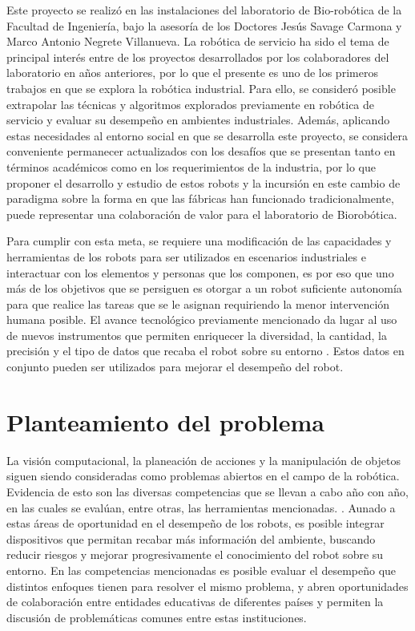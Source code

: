 Este proyecto se realizó en las instalaciones del laboratorio de Bio-robótica de la Facultad de Ingeniería, bajo la asesoría de los Doctores Jesús Savage Carmona y Marco Antonio Negrete Villanueva. La robótica de servicio ha sido el tema de principal interés entre de los proyectos desarrollados por los colaboradores del laboratorio en años anteriores, por lo que el presente es uno de los primeros trabajos en que se explora la robótica industrial. Para ello, se consideró posible extrapolar las técnicas y algoritmos explorados previamente en robótica de servicio y evaluar su desempeño en ambientes industriales. Además, aplicando estas necesidades al entorno social en que se desarrolla este proyecto, se considera conveniente permanecer actualizados con los desafíos que se presentan tanto en términos académicos como en los requerimientos de la industria, por lo que proponer el desarrollo y estudio de estos robots y la incursión en este cambio de paradigma sobre la forma en que las fábricas han funcionado tradicionalmente, puede representar una colaboración de valor para el laboratorio de Biorobótica.

Para cumplir con esta meta, se requiere una modificación de las capacidades y herramientas de los robots para ser utilizados en escenarios industriales e interactuar con los elementos y personas que los componen, es por eso que uno más de los objetivos que se persiguen es otorgar a un robot suficiente autonomía para que realice las tareas que se le asignan requiriendo la menor intervención humana posible. El avance tecnológico previamente mencionado da lugar al uso de nuevos instrumentos que permiten enriquecer la diversidad, la cantidad, la precisión y el tipo de datos que recaba el robot sobre su entorno \cite{basco_industria_2018}. Estos datos en conjunto pueden ser utilizados para mejorar el desempeño del robot.

\section{Planteamiento del problema}
La visión computacional, la planeación de acciones y la manipulación de objetos siguen siendo consideradas como problemas abiertos en el campo de la robótica. Evidencia de esto son las diversas competencias que se llevan a cabo año con año, en las cuales se evalúan, entre otras, las herramientas mencionadas. \cite{sun_research_2022}. Aunado a estas áreas de oportunidad en el desempeño de los robots, es posible integrar dispositivos que permitan recabar más información del ambiente, buscando reducir riesgos y mejorar progresivamente el conocimiento del robot sobre su entorno. En las competencias mencionadas es posible evaluar el desempeño que distintos enfoques tienen para resolver el mismo problema, y abren oportunidades de colaboración entre entidades educativas de diferentes países y permiten la discusión de problemáticas comunes entre estas instituciones.\\

